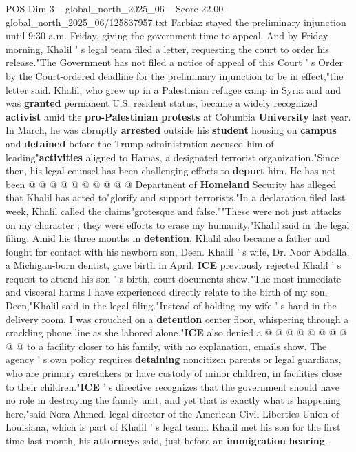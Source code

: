 \begin{textsample}{POS Dim 3 – global\_north\_2025\_06 – Score 22.00 – global\_north\_2025\_06/125837957.txt}
Farbiaz stayed the preliminary injunction until 9:30 a.m.
Friday, giving the government time to appeal.
And by Friday morning, Khalil ' s legal team filed a letter, requesting the court to order his release."The Government has not filed a notice of appeal of this Court ' s Order by the Court-ordered deadline for the preliminary injunction to be in effect,"the letter said.
Khalil, who grew up in a Palestinian refugee camp in Syria and and was \textbf{granted} permanent U.S. resident status, became a widely recognized \textbf{activist} amid the \textbf{pro-Palestinian} \textbf{protests} at Columbia \textbf{University} last year.
In March, he was abruptly \textbf{arrested} outside his \textbf{student} housing on \textbf{campus} and \textbf{detained} before the Trump administration accused him of leading"\textbf{activities} aligned to Hamas, a designated terrorist organization."Since then, his legal counsel has been challenging efforts to \textbf{deport} him.
He has not been @ @ @ @ @ @ @ @ @ @ Department of \textbf{Homeland} Security has alleged that Khalil has acted to"glorify and support terrorists."In a declaration filed last week, Khalil called the claims"grotesque and false.""These were not just attacks on my character ; they were efforts to erase my humanity,"Khalil said in the legal filing.
Amid his three months in \textbf{detention}, Khalil also became a father and fought for contact with his newborn son, Deen.
Khalil ' s wife, Dr.
Noor Abdalla, a Michigan-born dentist, gave birth in April. \textbf{ICE} previously rejected Khalil ' s request to attend his son ' s birth, court documents show."The most immediate and visceral harms I have experienced directly relate to the birth of my son, Deen,"Khalil said in the legal filing."Instead of holding my wife ' s hand in the delivery room, I was crouched on a \textbf{detention} center floor, whispering through a crackling phone line as she labored alone."\textbf{ICE} also denied a @ @ @ @ @ @ @ @ @ @ to a facility closer to his family, with no explanation, emails show.
The agency ' s own policy requires \textbf{detaining} noncitizen parents or legal guardians, who are primary caretakers or have custody of minor children, in facilities close to their children."\textbf{ICE} ' s directive recognizes that the government should have no role in destroying the family unit, and yet that is exactly what is happening here,"said Nora Ahmed, legal director of the American Civil Liberties Union of Louisiana, which is part of Khalil ' s legal team.
Khalil met his son for the first time last month, his \textbf{attorneys} said, just before an \textbf{immigration} \textbf{hearing}.

\end{textsample}
